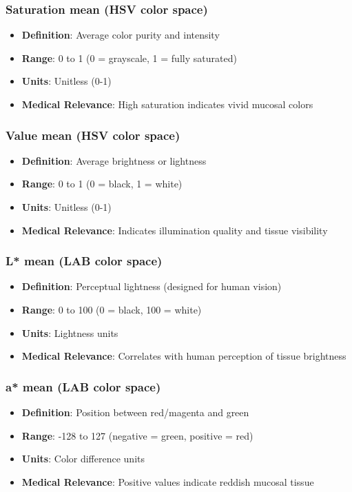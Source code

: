 \documentclass[11pt]{article}
\begin{document}
\subsubsection{Saturation mean (HSV color space)}
\begin{itemize}
    \item \textbf{Definition}: Average color purity and intensity
    \item \textbf{Range}: 0 to 1 (0 = grayscale, 1 = fully saturated)
    \item \textbf{Units}: Unitless (0-1)
    \item \textbf{Medical Relevance}: High saturation indicates vivid mucosal colors
\end{itemize}

\subsubsection{Value mean (HSV color space)}
\begin{itemize}
    \item \textbf{Definition}: Average brightness or lightness
    \item \textbf{Range}: 0 to 1 (0 = black, 1 = white)
    \item \textbf{Units}: Unitless (0-1)
    \item \textbf{Medical Relevance}: Indicates illumination quality and tissue visibility
\end{itemize}

\subsubsection{L* mean (LAB color space)}
\begin{itemize}
    \item \textbf{Definition}: Perceptual lightness (designed for human vision)
    \item \textbf{Range}: 0 to 100 (0 = black, 100 = white)
    \item \textbf{Units}: Lightness units
    \item \textbf{Medical Relevance}: Correlates with human perception of tissue brightness
\end{itemize}

\subsubsection{a* mean (LAB color space)}
\begin{itemize}
    \item \textbf{Definition}: Position between red/magenta and green
    \item \textbf{Range}: -128 to 127 (negative = green, positive = red)
    \item \textbf{Units}: Color difference units
    \item \textbf{Medical Relevance}: Positive values indicate reddish mucosal tissue
\end{itemize}
\end{document}
